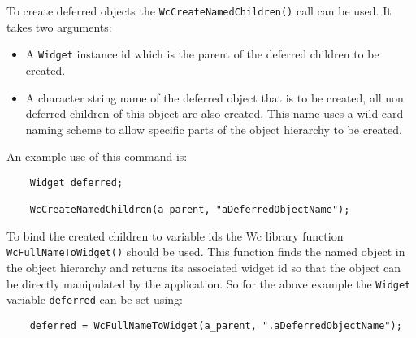 To create deferred objects the {\tt WcCreateNamedChildren()} call
can be used.  It takes two arguments:\begin{itemize}
\item{}
A {\tt Widget} instance id which is the parent of the deferred children 
to be created.
\item{}
A character string name of the deferred object that 
is to be created, all non deferred children of this object are also 
created. This name uses a wild-card naming scheme to allow specific 
parts of the object hierarchy to be created.
\end{itemize}
An example use of this command is:\begin{verbatim}
    Widget deferred;

    WcCreateNamedChildren(a_parent, "aDeferredObjectName");
\end{verbatim}
To bind the created children to variable ids the Wc library function 
{\tt WcFullNameToWidget()} should be used.  This function finds the 
named object in the object hierarchy and returns its associated widget 
id so that the object can be directly manipulated by the application.  
So for the above example the {\tt Widget} variable {\tt deferred} can be 
set using:\begin{verbatim}
    deferred = WcFullNameToWidget(a_parent, ".aDeferredObjectName");
\end{verbatim}

